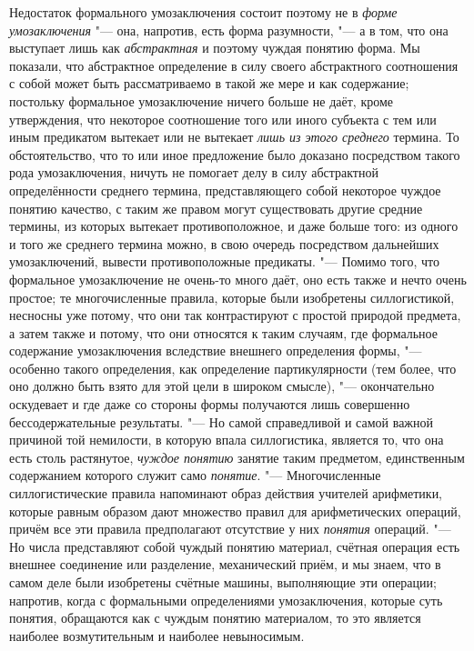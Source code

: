 Недостаток формального умозаключения состоит поэтому не в
{\em форме умозаключения}
"--- она, напротив, есть форма разумности, "--- а в
том, что она выступает лишь как
{\em абстрактная} и
поэтому чуждая понятию форма. Мы показали, что абстрактное определение в
силу своего абстрактного соотношения с собой может быть рассматриваемо в
такой же мере и как содержание; постольку формальное умозаключение ничего
больше не даёт, кроме утверждения, что некоторое соотношение того или иного
субъекта с тем или иным предикатом вытекает или не вытекает
{\em лишь из этого среднего}
термина. То обстоятельство, что то или иное предложение было
доказано посредством такого рода умозаключения, ничуть не помогает делу в
силу абстрактной определённости среднего термина, представляющего собой
некоторое чуждое понятию качество, с таким же правом могут существовать
другие средние термины, из которых вытекает противоположное, и даже больше
того: из одного и того же среднего термина можно, в свою очередь
посредством дальнейших умозаключений, вывести противоположные предикаты. "---
Помимо того, что формальное умозаключение не очень-то много
даёт, оно есть также и нечто очень простое; те многочисленные правила,
которые были изобретены силлогистикой, несносны уже потому, что они так
контрастируют с простой природой предмета, а затем также и потому, что они
относятся к таким случаям, где формальное содержание
умозаключения вследствие внешнего определения формы, "---
особенно такого определения, как определение партикулярности
(тем более, что оно должно быть взято для этой цели в широком смысле), "---
окончательно оскудевает и где даже со стороны формы
получаются лишь совершенно бессодержательные результаты. "---
Но самой справедливой и самой важной причиной той немилости,
в которую впала силлогистика, является то, что она есть столь растянутое,
{\em чуждое понятию}
занятие таким предметом, единственным содержанием которого
служит само {\em понятие}. "---
Многочисленные силлогистические правила напоминают образ
действия учителей арифметики, которые равным образом дают множество правил
для арифметических операций, причём все эти правила предполагают отсутствие
у них {\em понятия}
операций. "--- Но числа представляют собой чуждый
понятию материал, счётная операция есть внешнее соединение или разделение,
механический приём, и мы знаем, что в самом деле были изобретены счётные
машины, выполняющие эти операции; напротив, когда с формальными
определениями умозаключения, которые суть понятия, обращаются как с чуждым
понятию материалом, то это является наиболее возмутительным и наиболее
невыносимым.

